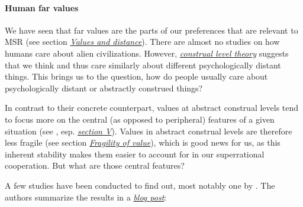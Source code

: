 \hypertarget{human-far-values}{\paragraph{Human far
values}\label{human-far-values}}

We have seen that far values are the parts of our preferences that are
relevant to MSR (see section
\protect\hyperlink{values-and-distance}{\emph{Values and
distance}}). There are almost no studies on how humans care about
alien civilizations. However,
\href{https://en.wikipedia.org/wiki/Construal_level_theory}{\emph{construal
level theory}} suggests that we think and thus care similarly about
different psychologically distant things. This brings us to the
question, how do people usually care about psychologically distant or
abstractly construed things?

In contrast to their concrete counterpart, values at abstract construal
levels tend to focus more on the central (as opposed to peripheral)
features of a given situation (see \parencite{Trope2010-vo},
esp.
\href{http://www.psych.nyu.edu/trope/Trope_Liberman_2010.pdf\#page=12}{\emph{section
V}}). Values in abstract construal levels are therefore less fragile
(see section \protect\hyperlink{fragility-of-value}{\emph{Fragility of
value}}), which is good news for us, as this inherent stability makes
them easier to account for in our superrational cooperation. But what
are those central features?

A few studies have been conducted to find out, most notably one by
\parencite{Bain2013-fc}. The authors summarize the results
in a
\href{https://spsptalks.wordpress.com/2013/07/14/the-utopias-of-everyday-people/}{\emph{blog
post}}:

